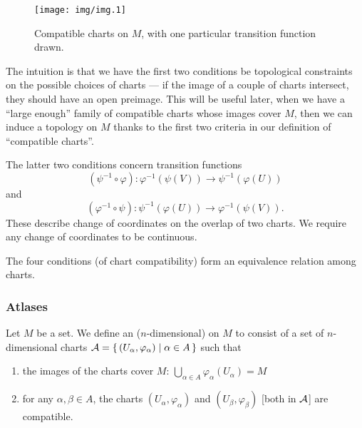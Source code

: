 \begin{figure}[H]
  \centering
  \texttt{[image: img/img.1]}
  \caption{Compatible charts on $M$, with one particular transition function drawn.}\label{fig:chart:compatibility}
\end{figure}

\begin{remark}
The intuition is that we have the first two conditions be topological
constraints on the possible choices of charts --- if the image of a
couple of charts intersect, they should have an open preimage.
This will be useful later, when we have a ``large enough'' family of
compatible charts whose images cover $M$, then we can induce a topology
on $M$ thanks to the first two criteria in our definition of
``compatible charts''.
\end{remark}

\begin{remark}
The latter two conditions concern transition functions
\begin{equation*}
(\psi^{-1}\circ\varphi)\colon\varphi^{-1}\left(\psi(V)\right)\to\psi^{-1}\left(\varphi(U)\right)
\end{equation*}
and
\begin{equation*}
(\varphi^{-1}\circ\psi)\colon\psi^{-1}\left(\varphi(U)\right)\to\varphi^{-1}\left(\psi(V)\right).
\end{equation*}
These describe change of coordinates on the overlap of two charts.
We require any change of coordinates to be continuous.
\end{remark}

\begin{remark}
The four conditions (of chart compatibility) form an equivalence relation
among charts.
\end{remark}

\subsubsection{Atlases}

\begin{definition}
Let $M$ be a set. We define an ($n$-dimensional)  on $M$
to consist of a set of $n$-dimensional charts
$\mathcal{A}=\{\,(U_{\alpha},\varphi_{\alpha})\mid\alpha\in A\,\}$
such that
\begin{enumerate}
\item the images of the charts cover $M$: $\displaystyle\bigcup_{\alpha\in{A}}\varphi_{\alpha}(U_{\alpha})=M$
\item for any $\alpha,\beta\in A$, the charts
  $(U_{\alpha},\varphi_{\alpha})$ and $(U_{\beta},\varphi_{\beta})$
  [both in $\mathcal{A}$] are compatible.
\end{enumerate}
\end{definition}

